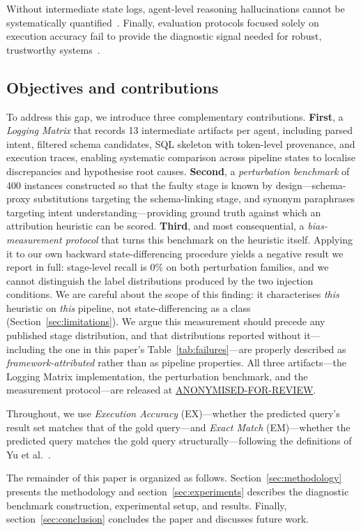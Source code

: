 \documentclass[conference]{IEEEtran}
\begin{document}
Without intermediate state logs, agent-level reasoning hallucinations cannot be systematically quantified~\cite{shen_select-sql_2024}. Finally, evaluation protocols focused solely on execution accuracy fail to provide the diagnostic signal needed for robust, trustworthy systems~\cite{huo_bird_interact_2026}.
\subsection{Objectives and contributions}
To address this gap, we introduce three complementary contributions. \textbf{First}, a \emph{Logging Matrix} that records 13 intermediate artifacts per agent, including parsed intent, filtered schema candidates, SQL skeleton with token-level provenance, and execution traces, enabling systematic comparison across pipeline states to localise discrepancies and hypothesise root causes. \textbf{Second}, a \emph{perturbation benchmark} of 400 instances constructed so that the faulty stage is known by design---schema-proxy substitutions targeting the schema-linking stage, and synonym paraphrases targeting intent understanding---providing ground truth against which an attribution heuristic can be scored. \textbf{Third}, and most consequential, a \emph{bias-measurement protocol} that turns this benchmark on the heuristic itself. Applying it to our own backward state-differencing procedure yields a negative result we report in full: stage-level recall is $0\%$ on both perturbation families, and we cannot distinguish the label distributions produced by the two injection conditions. We are careful about the scope of this finding: it characterises \emph{this} heuristic on \emph{this} pipeline, not state-differencing as a class (Section~\ref{sec:limitations}). We argue this measurement should precede any published stage distribution, and that distributions reported without it---including the one in this paper's Table~\ref{tab:failures}---are properly described as \emph{framework-attributed} rather than as pipeline properties. All three artifacts---the Logging Matrix implementation, the perturbation benchmark, and the measurement protocol---are released at \url{ANONYMISED-FOR-REVIEW}.

Throughout, we use \emph{Execution Accuracy} (EX)---whether the predicted query's result set matches that of the gold query---and \emph{Exact Match} (EM)---whether the predicted query matches the gold query structurally---following the definitions of Yu et al.~\cite{yu_spider_2018}.

The remainder of this paper is organized as follows. Section~\ref{sec:methodology} presents the methodology and section~\ref{sec:experiments} describes the diagnostic benchmark construction, experimental setup, and results. Finally, section~\ref{sec:conclusion} concludes the paper and discusses future work.
\end{document}
